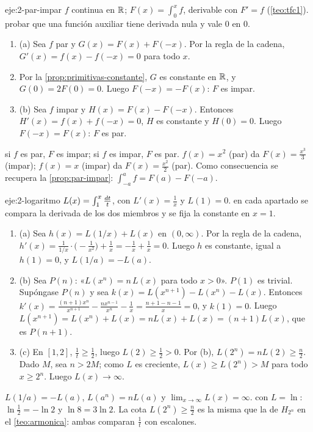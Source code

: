\begin{solucion}{eje:2-par-impar}
\datos $f$ continua en $\mathbb{R}$; $F(x)=\int_0^{x}f$, derivable con $F'=f$ (\cref{teo:tfc1}).
\planteamiento probar que una función auxiliar tiene derivada nula y vale $0$ en $0$.
\pasos
\begin{enumerate}[label=\arabic*.]
  \item (a) Sea $f$ par y $G(x)=F(x)+F(-x)$. Por la regla de la cadena, $G'(x)=f(x)-f(-x)=0$ para todo $x$.
  \item Por la \cref{prop:primitivas-constante}, $G$ es constante en $\mathbb{R}$, y $G(0)=2F(0)=0$. Luego $F(-x)=-F(x)$: $F$ es impar.
  \item (b) Sea $f$ impar y $H(x)=F(x)-F(-x)$. Entonces $H'(x)=f(x)+f(-x)=0$, $H$ es constante y $H(0)=0$. Luego $F(-x)=F(x)$: $F$ es par.
\end{enumerate}
\resultado si $f$ es par, $F$ es impar; si $f$ es impar, $F$ es par.
\comprobacion $f(x)=x^{2}$ (par) da $F(x)=\frac{x^{3}}{3}$ (impar); $f(x)=x$ (impar) da $F(x)=\frac{x^{2}}{2}$ (par). Como consecuencia se recupera la \cref{prop:par-impar}: $\int_{-a}^{a}f=F(a)-F(-a)$.
\end{solucion}

\begin{solucion}{eje:2-logaritmo}
\datos $L(x)=\int_1^{x}\frac{\mathop{}\!d t}{t}$, con $L'(x)=\frac1x$ y $L(1)=0$.
\planteamiento en cada apartado se compara la derivada de los dos miembros y se fija la constante en $x=1$.
\pasos
\begin{enumerate}[label=\arabic*.]
  \item (a) Sea $h(x)=L(1/x)+L(x)$ en $(0,\infty)$. Por la regla de la cadena, $h'(x)=\frac{1}{1/x}\cdot\bigl(-\frac{1}{x^{2}}\bigr)+\frac1x=-\frac1x+\frac1x=0$. Luego $h$ es constante, igual a $h(1)=0$, y $L(1/a)=-L(a)$.
  \item (b) Sea $P(n)$: «$L(x^{n})=n\,L(x)$ para todo $x>0$». $P(1)$ es trivial. Supóngase $P(n)$ y sea $k(x)=L(x^{n+1})-L(x^{n})-L(x)$. Entonces $k'(x)=\frac{(n+1)x^{n}}{x^{n+1}}-\frac{nx^{n-1}}{x^{n}}-\frac1x=\frac{n+1-n-1}{x}=0$, y $k(1)=0$. Luego $L(x^{n+1})=L(x^{n})+L(x)=nL(x)+L(x)=(n+1)L(x)$, que es $P(n+1)$.
  \item (c) En $[1,2]$, $\frac1t\ge\frac12$, luego $L(2)\ge\frac12>0$. Por (b), $L(2^{n})=nL(2)\ge\frac n2$. Dado $M$, sea $n>2M$; como $L$ es creciente, $L(x)\ge L(2^{n})>M$ para todo $x\ge2^{n}$. Luego $L(x)\to\infty$.
\end{enumerate}
\resultado $L(1/a)=-L(a)$, $L(a^{n})=nL(a)$ y $\lim_{x\to\infty}L(x)=\infty$.
\comprobacion con $L=\ln$: $\ln\frac12=-\ln2$ y $\ln8=3\ln2$. La cota $L(2^{n})\ge\frac n2$ es la misma que la de $H_{2^{n}}$ en el \cref{teo:armonica}: ambas comparan $\frac1t$ con escalones.
\end{solucion}

